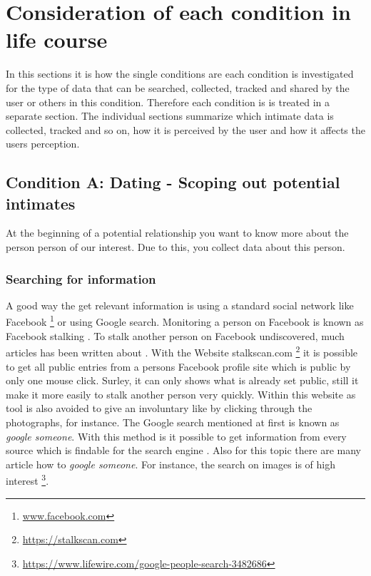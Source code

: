 \section{Consideration of each condition in life course}
\label{sec:consideration_life_course_conditions}
In this sections it is  how the single conditions are
each condition is investigated for the type of data that can be searched, collected, tracked and shared by the user or others in this condition.
Therefore each condition is is treated in a separate section. The individual sections summarize which intimate data is collected, tracked and so on, how it is perceived by the user and how it affects the users perception.


 
\subsection{Condition A: Dating - Scoping out potential intimates}
\label{subsec:A}
At the beginning of a potential relationship you want to know more about the person person of our interest. Due to this, you collect data about this person. 
\subsubsection{Searching for information}
A good way the get relevant information is using a standard social network like Facebook \footnote{\url{www.facebook.com}} or using Google search. Monitoring a person on Facebook is known as Facebook stalking \cite{levy2014intimate}. To stalk another person on Facebook undiscovered, much articles has been written about \cite{sueddeutsche_fb_stalking}. With the Website stalkscan.com \footnote{\url{https://stalkscan.com}} it is possible to get all public entries from a persons Facebook profile site which is public by only one mouse click. Surley, it can only shows what is already set public, still it make it more easily to stalk another person very quickly.
Within this website as tool is also avoided to give an involuntary like by clicking through the photographs, for instance.
The Google search mentioned at first is known as \textit{google someone}. With this method is it possible to get information from every source which is findable for the search engine \cite{nolan2005hacking}. Also for this topic there are many article how to \textit{google someone}. For instance, the search on images is of high interest \footnote{\url{https://www.lifewire.com/google-people-search-3482686}}.




